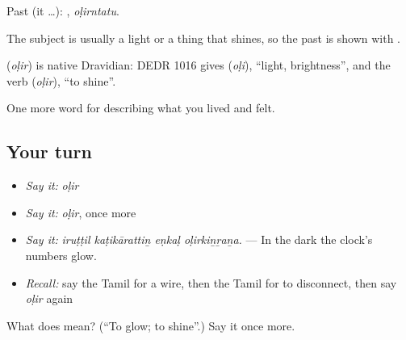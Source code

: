 Past (it …): , \emph{oḷirntatu}.

The subject is usually a light or a thing that shines, so the past is shown with .

\begin{cousinweb}
\textbf{} (\emph{oḷir}) is native Dravidian: DEDR 1016 gives  (\emph{oḷi}), \textquotedblleft{}light, brightness\textquotedblright{}, and the verb  (\emph{oḷir}), \textquotedblleft{}to shine\textquotedblright{}.
\end{cousinweb}

\begin{grammarlens}[title={What you've built}]
One more word for describing what you lived and felt.
\end{grammarlens}

\subsection*{Your turn}
\begin{itemize}
\raggedright
  \item \emph{Say it:} \emph{oḷir}
  \item \emph{Say it:} \emph{oḷir}, once more
  \item \emph{Say it:} \emph{iruṭṭil kaṭikārattiṉ eṇkaḷ oḷirkiṉṟaṉa.} — In the dark the clock's numbers glow.
  \item \emph{Recall:} say the Tamil for a wire, then the Tamil for to disconnect, then say \emph{oḷir} again
\end{itemize}

\begin{tcolorbox}[breakable,colback=teal!4,colframe=teal!35!black,title={Before you move on}]
What does  mean? (\textquotedblleft{}To glow; to shine\textquotedblright{}.) Say it once more.
\end{tcolorbox}
